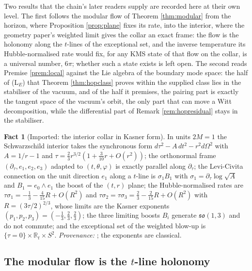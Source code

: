 \documentclass[11pt]{article}
\theoremstyle{definition}
\newtheorem{fact}[theorem]{Fact}
\newcommand{\R}{\mathbb{R}}
\begin{document}
Two results that the chain's later readers supply are recorded here at their own level. The first follows the modular flow of Theorem \ref{thm:modular} from the horizon, where Proposition \ref{prop:plane} fixes its rate, into the interior, where the geometry paper's weighted limit gives the collar an exact frame: the flow is the holonomy along the $t$-lines of the exceptional set, and the inverse temperature its Hubble-normalised rate would fix, for any KMS state of that flow on the collar, is a universal number, $6\pi$; whether such a state exists is left open. The second reads Premise \ref{prem:local} against the Lie algebra of the boundary mode space: the half of (L$_E$) that Theorem \ref{thm:hopclass} proves within the supplied class lies in the stabiliser of the vacuum, and of the half it premises, the pairing part is exactly the tangent space of the vacuum's orbit, the only part that can move a Witt decomposition, while the differential part of Remark \ref{rem:hopresidual} stays in the stabiliser.

\begin{fact}[Imported: the interior collar in Kasner form]\label{fact:collar}
In units $2M = 1$ the Schwarzschild interior takes the synchronous form $d\tau^2 - A\,dt^2 - r^2 d\Omega^2$ with $A = 1/r - 1$ and $\tau = \tfrac23 r^{3/2}(1 + \tfrac{3}{10}r + O(r^2))$; the orthonormal frame $(\partial_\tau, e_1, e_2, e_3)$ adapted to $(t, \theta, \varphi)$ is exactly parallel along $\partial_\tau$; the Levi-Civita connection on the unit direction $e_1$ along a $t$-line is $\sigma_1 B_1$ with $\sigma_1 = \partial_\tau \log\sqrt{A}$ and $B_1 = e_0 \wedge e_1$ the boost of the $(t, r)$ plane; the Hubble-normalised rates are $\tau\sigma_1 = -\tfrac13 - \tfrac{4}{15}R + O(R^2)$ and $\tau\sigma_2 = \tau\sigma_3 = \tfrac23 - \tfrac{2}{15}R + O(R^2)$ with $R = (3\tau/2)^{2/3}$, whose limits are the Kasner exponents $(p_1, p_2, p_3) = (-\tfrac13, \tfrac23, \tfrac23)$; the three limiting boosts $B_i$ generate $\mathfrak{so}(1,3)$ and do not commute; and the exceptional set of the weighted blow-up is $\{\tau = 0\} \times \R_t \times S^2$. \emph{Provenance:} \cite[Lemmas 5.1 to 5.3, Def.~5.5, Thm.~5.6]{ButlerT6}; the exponents are classical.
\end{fact}

\subsection{The modular flow is the $t$-line holonomy}\label{subsec:holonomy}
\end{document}
